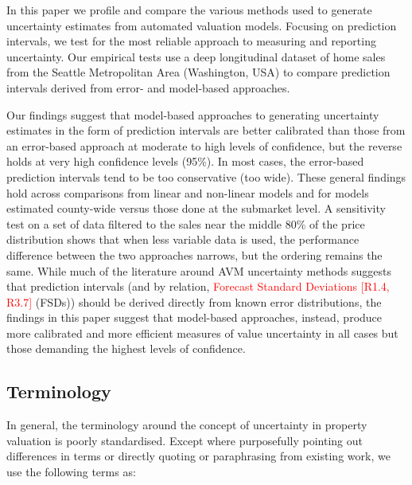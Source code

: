 \documentclass[colTwo]{anon}
\theoremstyle{definition}
\begin{document}
In this paper we profile and compare the various methods used to generate uncertainty estimates from automated valuation models. Focusing on prediction intervals, we test for the most reliable approach to measuring and reporting uncertainty.   Our empirical tests use a deep longitudinal dataset of home sales from the Seattle Metropolitan Area (Washington, USA) to compare prediction intervals derived from error- and model-based approaches. 

Our findings suggest that model-based approaches to generating uncertainty estimates in the form of prediction intervals are better calibrated than those from an error-based approach at moderate to high levels of confidence, but the reverse holds at very high confidence levels (95\%). In most cases, the error-based prediction intervals tend to be too conservative (too wide).  These general findings hold across comparisons from linear and non-linear models and for models estimated county-wide versus those done at the submarket level. A sensitivity test on a set of data filtered to the sales near the middle 80\% of the price distribution shows that when less variable data is used, the performance difference between the two approaches narrows, but the ordering remains the same. While much of the literature around AVM uncertainty methods suggests that prediction intervals (and by relation, \textcolor{red}{Forecast Standard Deviations [R1.4, R3.7]} (FSDs)) should be derived directly from known error distributions, the findings in this paper suggest that model-based approaches, instead, produce more calibrated and more efficient measures of value uncertainty in all cases but those demanding the highest levels of confidence.  

\subsection{Terminology}

In general, the terminology around the concept of uncertainty in property valuation is poorly standardised. Except where purposefully pointing out differences in terms or directly quoting or paraphrasing from existing work, we use the following terms as:
\end{document}

